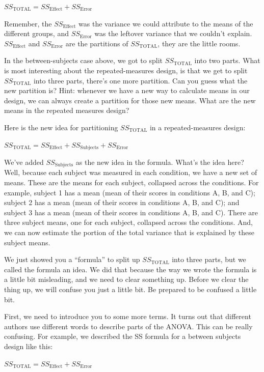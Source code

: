 \documentclass[]{book}
\begin{document}
\(SS_\text{TOTAL} = SS_\text{Effect} + SS_\text{Error}\)

Remember, the \(SS_\text{Effect}\) was the variance we could attribute to the means of the different groups, and \(SS_\text{Error}\) was the leftover variance that we couldn't explain. \(SS_\text{Effect}\) and \(SS_\text{Error}\) are the partitions of \(SS_\text{TOTAL}\), they are the little rooms.

In the between-subjects case above, we got to split \(SS_\text{TOTAL}\) into two parts. What is most interesting about the repeated-measures design, is that we get to split \(SS_\text{TOTAL}\) into three parts, there's one more partition. Can you guess what the new partition is? Hint: whenever we have a new way to calculate means in our design, we can always create a partition for those new means. What are the new means in the repeated measures design?

Here is the new idea for partitioning \(SS_\text{TOTAL}\) in a repeated-measures design:

\(SS_\text{TOTAL} = SS_\text{Effect} + SS_\text{Subjects} +SS_\text{Error}\)

We've added \(SS_\text{Subjects}\) as the new idea in the formula. What's the idea here? Well, because each subject was measured in each condition, we have a new set of means. These are the means for each subject, collapsed across the conditions. For example, subject 1 has a mean (mean of their scores in conditions A, B, and C); subject 2 has a mean (mean of their scores in conditions A, B, and C); and subject 3 has a mean (mean of their scores in conditions A, B, and C). There are three subject means, one for each subject, collapsed across the conditions. And, we can now estimate the portion of the total variance that is explained by these subject means.

We just showed you a ``formula'' to split up \(SS_\text{TOTAL}\) into three parts, but we called the formula an idea. We did that because the way we wrote the formula is a little bit misleading, and we need to clear something up. Before we clear the thing up, we will confuse you just a little bit. Be prepared to be confused a little bit.

First, we need to introduce you to some more terms. It turns out that different authors use different words to describe parts of the ANOVA. This can be really confusing. For example, we described the SS formula for a between subjects design like this:

\(SS_\text{TOTAL} = SS_\text{Effect} + SS_\text{Error}\)
\end{document}
